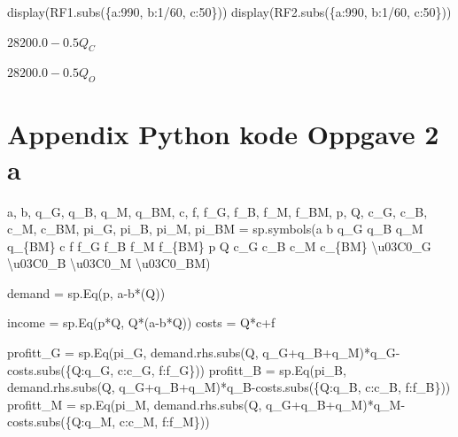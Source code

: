 \documentclass[
  12pt,
  a4paper,
  DIV=11,
  numbers=noendperiod]{scrartcl}
\newenvironment{Shaded}{\begin{snugshade}}{\end{snugshade}}
\newcommand{\CharTok}[1]{\textcolor[rgb]{0.13,0.47,0.30}{#1}}
\newcommand{\DecValTok}[1]{\textcolor[rgb]{0.68,0.00,0.00}{#1}}
\newcommand{\NormalTok}[1]{\textcolor[rgb]{0.00,0.23,0.31}{#1}}
\newcommand{\OperatorTok}[1]{\textcolor[rgb]{0.37,0.37,0.37}{#1}}
\newcommand{\SpecialCharTok}[1]{\textcolor[rgb]{0.37,0.37,0.37}{#1}}
\newcommand{\StringTok}[1]{\textcolor[rgb]{0.13,0.47,0.30}{#1}}
\begin{document}
\begin{Shaded}
\begin{Highlighting}[]
\NormalTok{display(RF1.subs(\{a:}\DecValTok{990}\NormalTok{, b:}\DecValTok{1}\OperatorTok{/}\DecValTok{60}\NormalTok{, c:}\DecValTok{50}\NormalTok{\}))}
\NormalTok{display(RF2.subs(\{a:}\DecValTok{990}\NormalTok{, b:}\DecValTok{1}\OperatorTok{/}\DecValTok{60}\NormalTok{, c:}\DecValTok{50}\NormalTok{\}))}
\end{Highlighting}
\end{Shaded}

$\displaystyle 28200.0 - 0.5 Q_{C}$

$\displaystyle 28200.0 - 0.5 Q_{O}$

\clearpage

\section {Appendix Python kode Oppgave 2 a}

\begin{Shaded}
\begin{Highlighting}[]
\NormalTok{a, b, q\_G, q\_B, q\_M, q\_BM, c, f, f\_G, f\_B, f\_M, f\_BM, p, Q, c\_G, c\_B, c\_M, c\_BM, pi\_G, pi\_B, pi\_M, pi\_BM }\OperatorTok{=}\NormalTok{ sp.symbols(}\StringTok{\textquotesingle{}a b q\_G q\_B q\_M q\_}\SpecialCharTok{\{BM\}}\StringTok{ c f f\_G f\_B f\_M f\_}\SpecialCharTok{\{BM\}}\StringTok{ p Q c\_G c\_B c\_M c\_}\SpecialCharTok{\{BM\}}\StringTok{ }\CharTok{\textbackslash{}u03C0}\StringTok{\_G }\CharTok{\textbackslash{}u03C0}\StringTok{\_B }\CharTok{\textbackslash{}u03C0}\StringTok{\_M }\CharTok{\textbackslash{}u03C0}\StringTok{\_BM\textquotesingle{}}\NormalTok{)}



\NormalTok{demand }\OperatorTok{=}\NormalTok{ sp.Eq(p, a}\OperatorTok{{-}}\NormalTok{b}\OperatorTok{*}\NormalTok{(Q))}

\NormalTok{income }\OperatorTok{=}\NormalTok{ sp.Eq(p}\OperatorTok{*}\NormalTok{Q, Q}\OperatorTok{*}\NormalTok{(a}\OperatorTok{{-}}\NormalTok{b}\OperatorTok{*}\NormalTok{Q))}
\NormalTok{costs }\OperatorTok{=}\NormalTok{ Q}\OperatorTok{*}\NormalTok{c}\OperatorTok{+}\NormalTok{f}




\NormalTok{profitt\_G }\OperatorTok{=}\NormalTok{ sp.Eq(pi\_G, demand.rhs.subs(Q, q\_G}\OperatorTok{+}\NormalTok{q\_B}\OperatorTok{+}\NormalTok{q\_M)}\OperatorTok{*}\NormalTok{q\_G}\OperatorTok{{-}}\NormalTok{costs.subs(\{Q:q\_G, c:c\_G, f:f\_G\}))}
\NormalTok{profitt\_B }\OperatorTok{=}\NormalTok{ sp.Eq(pi\_B, demand.rhs.subs(Q, q\_G}\OperatorTok{+}\NormalTok{q\_B}\OperatorTok{+}\NormalTok{q\_M)}\OperatorTok{*}\NormalTok{q\_B}\OperatorTok{{-}}\NormalTok{costs.subs(\{Q:q\_B, c:c\_B, f:f\_B\}))}
\NormalTok{profitt\_M }\OperatorTok{=}\NormalTok{ sp.Eq(pi\_M, demand.rhs.subs(Q, q\_G}\OperatorTok{+}\NormalTok{q\_B}\OperatorTok{+}\NormalTok{q\_M)}\OperatorTok{*}\NormalTok{q\_M}\OperatorTok{{-}}\NormalTok{costs.subs(\{Q:q\_M, c:c\_M, f:f\_M\}))}
\end{Highlighting}
\end{Shaded}
\end{document}
